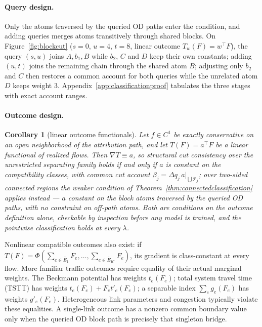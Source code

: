 \documentclass[a4paper,fleqn]{cas-sc}
\newtheorem{corollary}[theorem]{Corollary}
\begin{document}
\paragraph{Query design.}
Only the atoms traversed by the queried OD paths enter the condition, and
adding queries merges atoms transitively through shared blocks. On
Figure~\ref{fig:blockcut} ($s=0$, $u=4$, $t=8$, linear outcome
$T_w(F)=w^\top F$), the query $(s,u)$ joins $A,b_1,B$ while $b_2$, $C$
and $D$ keep their own constants; adding $(u,t)$ joins the remaining
chain through the shared atom $B$; adjusting only $b_2$ and $C$ then
restores a common account for both queries while the unrelated atom $D$
keeps weight $3$. Appendix~\ref{app:classificationproof} tabulates the
three stages with exact account ranges.

\paragraph{Outcome design.}
\begin{corollary}[linear outcome functionals]\label{cor:linear}
Let $f\in C^1$ be exactly conservative on an open neighborhood of the
attribution path, and let $T(F)=a^\top F$ be a linear functional of
realized flows. Then $\nabla T\equiv a$, so structural cut consistency
over the unrestricted separating family holds if and only if $a$ is
constant on the compatibility classes, with common cut account
$\beta_j=\Delta q_j\,a|_{\bigcup\mathcal{P}_j}$; over two-sided
connected regions the weaker condition of
Theorem~\ref{thm:connectedclassification} applies instead --- $a$
constant on the block atoms traversed by the queried OD paths, with no
constraint on off-path atoms. Both are conditions on the outcome
definition alone, checkable by inspection before any model is trained,
and the pointwise classification holds at every $\lambda$.
\end{corollary}
Nonlinear compatible outcomes also exist: if
$T(F)=\Phi(\sum_{e\in\bar E_1}F_e,\ldots,\sum_{e\in\bar E_{K'}}F_e)$,
its gradient is class-constant at every flow. More familiar traffic outcomes
require equality of their actual marginal weights. The Beckmann potential
has weights $t_e(F_e)$; total system travel time (TSTT) has weights
$t_e(F_e)+F_et'_e(F_e)$; a separable index $\sum_e g_e(F_e)$ has
weights $g'_e(F_e)$. Heterogeneous link parameters and congestion typically
violate these equalities. A single-link outcome has a nonzero common boundary value
only when the queried OD block path is precisely that singleton bridge.
\end{document}
